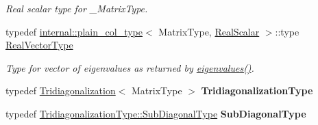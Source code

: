 \begin{DoxyCompactItemize}
\begin{DoxyCompactList}\small\item\em Real scalar type for {\ttfamily \+\_\+\+Matrix\+Type}. \end{DoxyCompactList}\item 
typedef \mbox{\hyperlink{struct_eigen_1_1internal_1_1plain__col__type}{internal\+::plain\+\_\+col\+\_\+type}}$<$ Matrix\+Type, \mbox{\hyperlink{class_eigen_1_1_self_adjoint_eigen_solver_a5dae5f422a3c71060e6bd31332bf64fd}{Real\+Scalar}} $>$\+::type \mbox{\hyperlink{class_eigen_1_1_self_adjoint_eigen_solver_acd090d5fdfc3cc017a13b6d8daa92287}{Real\+Vector\+Type}}
\begin{DoxyCompactList}\small\item\em Type for vector of eigenvalues as returned by \mbox{\hyperlink{class_eigen_1_1_self_adjoint_eigen_solver_a8efab27e82aa6aa0ae0c64739238c2e0}{eigenvalues()}}. \end{DoxyCompactList}\item 
\mbox{\label{class_eigen_1_1_self_adjoint_eigen_solver_aee7b34cdccc189fa836c20f55f8415dd}} 
typedef \mbox{\hyperlink{class_eigen_1_1_tridiagonalization}{Tridiagonalization}}$<$ Matrix\+Type $>$ {\bfseries Tridiagonalization\+Type}
\item 
\mbox{\label{class_eigen_1_1_self_adjoint_eigen_solver_aeef7348fa4e1c14b469fd26d17f7713e}} 
typedef \mbox{\hyperlink{class_eigen_1_1_matrix}{Tridiagonalization\+Type\+::\+Sub\+Diagonal\+Type}} {\bfseries Sub\+Diagonal\+Type}
\end{DoxyCompactItemize}
